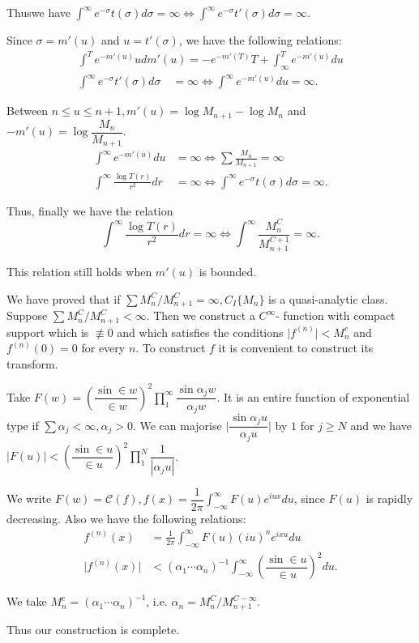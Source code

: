 Thus\pageoriginale we have $\int^\infty e^{- \sigma} t (\sigma) d \sigma = \infty
\Leftrightarrow \int^\infty e^{- \sigma} t' (\sigma) d \sigma =
\infty$. 
 
Since $\sigma = m' (u)$ and $u = t' (\sigma)$, we have the following relations:
\begin{gather*}
 \int^T e^{-m'(u)} udm' (u) = - e^{-m' (T)} T+ \int^T_ \infty e^{- m' (u)} du\\
 \int^\infty e^{- \sigma} t' (\sigma) d \sigma \quad = \infty
 \Leftrightarrow \int^\infty e^{- m' (u)} du = \infty. 
\end{gather*}

Between $n \le u \le n + 1, m'(u) = \log M_{n+1} - \log M_n$ and $-
m'(u) = \log \dfrac{M_n}{M_{n+1}}$. 
\begin{align*}
 \int^\infty e^{-m' (u)} du &= \infty \Leftrightarrow \sum
 \frac{M_n}{M_{n+1}}= \infty\\ 
 \int^\infty \frac{\log T(r)}{r^2} dr & = \infty \Leftrightarrow
 \int^\infty e^{- \sigma} t (\sigma) d \sigma = \infty. 
\end{align*}

Thus, finally we have the relation
$$
\int^\infty \frac{\log T(r)}{r^2} dr = \infty \Leftrightarrow
\int^\infty \frac{M^C_n}{M^{C+1}_{n+1}} = \infty. 
$$

This relation still holds when $m'(u)$ is bounded.

We have proved that if $\sum M^C_n / M^C_{n+1} = \infty, C_I \{M_n\} $
is a quasi-analytic class. Suppose $\sum M^C_n / M^C_{n+1} <
\infty$. Then we construct a $C^\infty$- function with compact support
which is $ \nequiv 0$ and which satisfies the conditions $\big | f^{(n)}
\big | < M^c_n$ and $f^{(n)} (0) = 0$ for every $n$. To construct $f$
it is convenient to construct its transform. 

Take $F(w) = \left(\dfrac{\sin \in w}{\in w}\right)^2
\prod\limits_{1}^\infty \dfrac{\sin \alpha_j w}{\alpha_j w}$. It is an
entire function of exponential type if $\sum \alpha_j < \infty,
\alpha_j > 0$. We can majorise $\big | \dfrac{\sin \alpha_j
 u}{\alpha_j u} \big | $ by $1$ for $j \ge N$ and we have $\big |
F(u) \big | < \left(\dfrac{\sin \in u}{\in u}\right)^2
\prod\limits_{1}^N \dfrac{1}{| \alpha_j u |}$. 

We write $F (w) = \mathscr{C}(f), f(x) = \dfrac{1}{2 \pi}
\int^\infty_{- \infty} F(u) e^{iux} du$, since $F(u)$ is rapidly
decreasing. Also we have the following relations: 
\begin{align*}
 f^{(n)} (x) & = \frac{1}{2 \pi} \int^\infty_{- \infty} F(u) (iu)^n e^{ixu} du\\
 \big | f^{(n)} (x) \big | & < (\alpha_1 \cdots \alpha_n)^{-1}
 \int^\infty_{- \infty} \left(\dfrac{\sin \in u}{\in u}\right)^2
 du. 
\end{align*}

We take $M^c_n = (\alpha_1 \cdots \alpha_n)^{-1}$, i.e. $\alpha_n =
M^C_n/M^{C-\infty}_{n+1}$. 

Thus our construction is complete.
